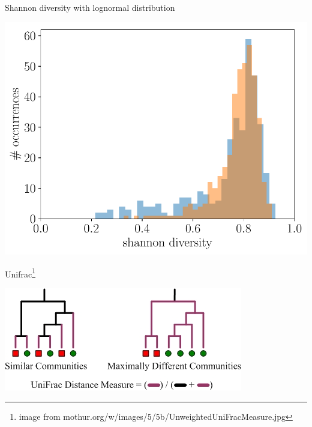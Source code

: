 \documentclass[
  ignorenonframetext,
]{beamer}
\begin{document}
\begin{frame}{Shannon diversity with lognormal distribution}
\protect\hypertarget{shannon-diversity-with-lognormal-distribution}{}

\includegraphics[width=\linewidth]{figs/shannon_div_1}

\end{frame}

\begin{frame}{Unifrac\footnote{image from mothur.org/w/images/5/5b/UnweightedUniFracMeasure.jpg}}
\protect\hypertarget{unifrac}{}

\includegraphics[width=\linewidth]{figs/UnweightedUniFracMeasure.jpg}

\end{frame}
\end{document}
